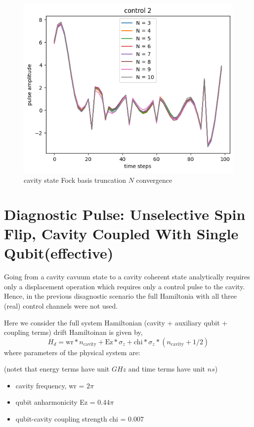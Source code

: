 \documentclass[12pt]{report}
\begin{document}
\begin{figure}[H]
    \centering
    \includegraphics[width=0.95\linewidth]{check_convergence_control2.png}
    \caption{cavity state Fock basis truncation $N$ convergence}
    \label{fig:check_convergence_control2}
\end{figure}

\section{Diagnostic Pulse: Unselective Spin Flip, Cavity Coupled With Single Qubit(effective)}
Going from a cavity cavuum state to a cavity coherent state analytically requires only a displacement operation
which requires only a control pulse to the cavity. Hence, in the previous disagnostic scenario the full Hamiltonia
with all three (real) control channels were not used.
\par
Here we consider the full system Hamiltonian (cavity + auxiliary qubit + coupling terms)
drift Hamiltoinan is given by, 
\begin{equation}
    H_d = \text{wr} * n_{\text{cavity}} + \text{Ez} * \sigma_z + \text{chi} * \sigma_z * (n_{\text{cavity}} + 1/2 )    
\end{equation}
where parameters of the physical system are:
\par
(notet that energy terms have unit $GHz$ and time terms have unit $ns$)
\begin{itemize}
    \item cavity frequency, wr = $2 \pi$
    \item qubit anharmonicity Ez = $0.44 \pi$
    \item qubit-cavity coupling strength chi = $0.007$
\end{itemize}
\end{document}
